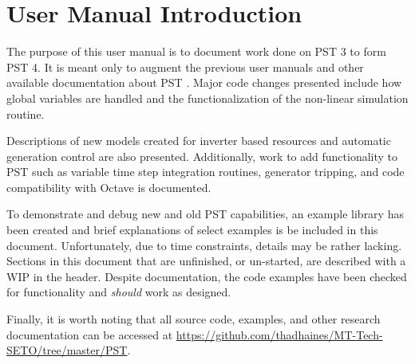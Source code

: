 \vspace{2em} %
\chapter*{User Manual Introduction}

The purpose of this user manual is to document work done on PST 3 to form PST 4. 
It is meant only to augment the previous user manuals and other available documentation about \mbox{PST} \cite{chow1992, PST2LFTut, PST3manual, chow2015}.
%
Major code changes presented include 
how global variables are handled
and the
functionalization of the non-linear simulation routine.

\vspace{1em}
Descriptions of new models created for
inverter based resources
and
automatic generation control
are also presented.
Additionally, work to add functionality to PST such as
variable time step integration routines,
generator tripping, %
and
code compatibility with Octave
is documented.



\vspace{1em}
To demonstrate and debug new and old PST capabilities, an example library has been created and brief explanations of select examples is be included in this document.
Unfortunately, due to time constraints, details may be rather lacking.
Sections in this document that are unfinished, or un-started, are described with a WIP in the header.
Despite documentation,  the code examples have been checked for functionality and \emph{should} work as designed.


\vspace{1em}
Finally, it is worth noting that all source code, examples, and other research documentation can be accessed at 
\href{https://github.com/thadhaines/MT-Tech-SETO/tree/master/PST}{https://github.com/thadhaines/MT-Tech-SETO/tree/master/PST}.
